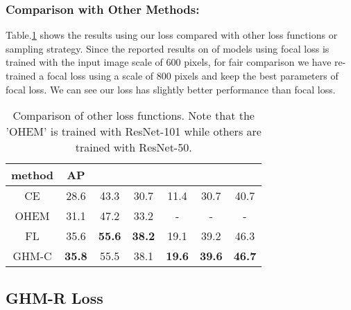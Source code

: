 \documentclass[letterpaper]{article} \usepackage{aaai19}  \usepackage{times}  \usepackage{helvet}  \usepackage{courier}  \usepackage{url}  \usepackage{graphicx}  \usepackage{amsmath,amssymb}
\begin{document}
\subsubsection{Comparison with Other Methods:} Table.\ref{tab:comp} shows the results using our loss compared with other loss functions or sampling strategy. Since the reported results on  of models using focal loss is trained with the input image scale of 600 pixels, for fair comparison we have re-trained a focal loss using a scale of 800 pixels and keep the best parameters of focal loss.
We can see our loss has slightly better performance than focal loss.
\begin{table}[!ht]
\begin{center}
\begin{tabular}{| c | c  c  c  c  c  c |}
\hline
method & AP &  &  &  &  &  \\
\hline
CE & 28.6 & 43.3 & 30.7 & 11.4 & 30.7 & 40.7 \\
OHEM & 31.1 & 47.2 & 33.2 & - & - & - \\
FL & 35.6 & \textbf{55.6} & \textbf{38.2} & 19.1 & 39.2 & 46.3 \\
\hline
GHM-C & \textbf{35.8} & 55.5 & 38.1 & \textbf{19.6} & \textbf{39.6} & \textbf{46.7} \\
\hline
\end{tabular}
\caption{Comparison of other loss functions. Note that the 'OHEM' is trained with ResNet-101 while others are trained with ResNet-50.}
\label{tab:comp}
\end{center}
\end{table}

\subsection{GHM-R Loss}
\end{document}
